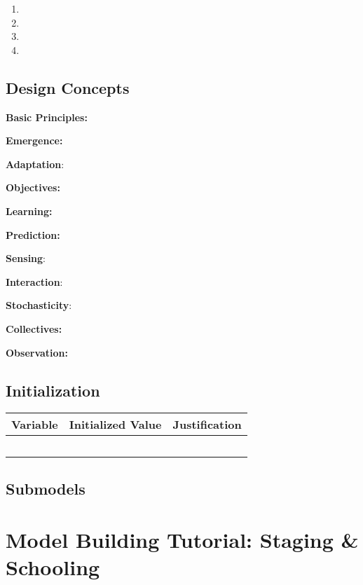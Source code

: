 \documentclass[
]{book}
\providecommand{\tightlist}{%
  \setlength{\itemsep}{0pt}\setlength{\parskip}{0pt}}
\begin{document}
\begin{enumerate}
\def\labelenumi{\arabic{enumi}.}
\tightlist
\item
\item
\item
\item
\end{enumerate}

\section{Design Concepts}\label{design-concepts-10}

\textbf{Basic Principles:}

\textbf{Emergence:}

\textbf{Adaptation}:

\textbf{Objectives:}

\textbf{Learning:}

\textbf{Prediction:}

\textbf{Sensing}:

\textbf{Interaction}:

\textbf{Stochasticity}:

\textbf{Collectives:}

\textbf{Observation:}

\section{Initialization}\label{initialization-10}

\begin{longtable}[]{@{}ccc@{}}
\toprule\noalign{}
Variable & Initialized Value & Justification \\
\midrule\noalign{}
\endhead
\bottomrule\noalign{}
\endlastfoot
& & \\
& & \\
& & \\
& & \\
& & \\
\end{longtable}

\section{Submodels}\label{submodels-10}

\chapter{Model Building Tutorial: Staging \& Schooling}\label{model-building-tutorial-staging-schooling}
\end{document}

